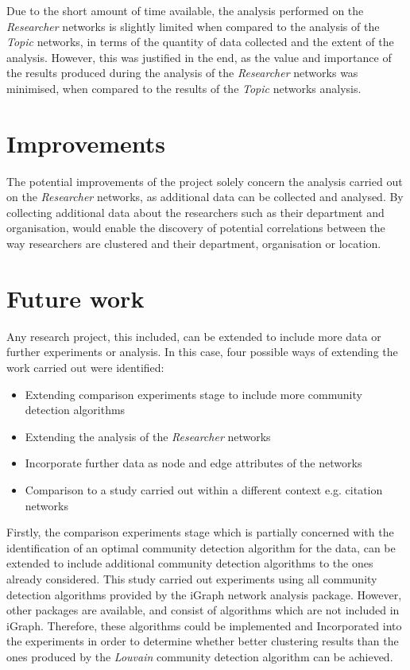 Due to the short amount of time available, the analysis performed on the \textit{Researcher} networks is slightly limited when compared to the analysis of the \textit{Topic} networks, in terms of the quantity of data collected and the extent of the analysis. However, this was justified in the end, as the value and importance of the results produced during the analysis of the \textit{Researcher} networks was minimised, when compared to the results of the \textit{Topic} networks analysis.

\section{Improvements}

The potential improvements of the project solely concern the analysis carried out on the \textit{Researcher} networks, as additional data can be collected and analysed. By collecting additional data about the researchers such as their department and organisation, would enable the discovery of potential correlations between the way researchers are clustered and their department, organisation or location.

\section{Future work}

Any research project, this included, can be extended to include more data or further experiments or analysis. In this case, four possible ways of extending the work carried out were identified:

\begin{itemize}[noitemsep]
    \item Extending comparison experiments stage to include more community detection algorithms
    \item Extending the analysis of the \textit{Researcher} networks
        \item Incorporate further data as node and edge attributes of the networks
    \item Comparison to a study carried out within a different context e.g. citation networks
\end{itemize}

\noindent Firstly, the comparison experiments stage which is partially concerned with the identification of an optimal community detection algorithm for the data, can be extended to include additional community detection algorithms to the ones already considered. This study carried out experiments using all community detection algorithms provided by the iGraph network analysis package. However, other packages are available, and consist of algorithms which are not included in iGraph. Therefore, these algorithms could be implemented and Incorporated into the experiments in order to determine whether better clustering results than the ones produced by the \textit{Louvain} community detection algorithm can be achieved.

